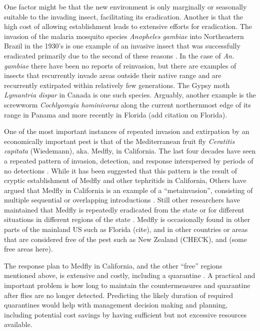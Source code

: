\documentclass[10pt,a4paper,twocolumn]{article}
\begin{document}
One factor might be that the new environment is only marginally or 
seasonally suitable to the invading insect, facilitating its eradication.
Another is that the high cost of allowing establishment leads
to extensive efforts for eradication.
The invasion of the malaria mosquito species \textit{Anopheles gambiae}
into Northeastern Brazil in the 1930's \cite{soper_emphanopheles_1943}
is one example of an invasive insect that was successfully eradicated 
primarily due to the second of these
reasons \cite{causey_ecology_1943,killeen_eradication_2002}.
In the case of \textit{An. gambiae} there have been no reports of
reinvasion, but there are examples of insects that
recurrently invade areas outside their native range and are recurrently
extirpated within relatively few generations.
The Gypsy moth \textit{Lymantria dispar} in Canada
\cite{gray_hitchhikers_2010} is one such species.
Arguably, another example is 
the screwworm \textit{Cochlyomyia hominivorax} along 
the current northernmost edge of its range in 
Panama\cite{robinson_enabling_2009}
and more recently in Florida (add citation on Florida).

One of the most important instances of repeated invasion 
and extirpation by an economically important pest is that of 
the Mediterranean fruit fly \textit{Ceratitis capitata} (Wiedemann), aka. Medfly, 
in California.  
The last four decades have seen a repeated pattern of
invasion, detection, and response 
interspersed by periods of no detections \cite{carey_establishment_1991, papadopoulos_trickle_2013}.
While it has been suggested that this pattern is the result of
cryptic establishment of Medfly and other tephritids in California, 
Others have argued that Medfly in California is an example of 
a ``metainvasion'', consisting of multiple sequential or
overlapping introductions \cite{davies_bioinvasions_1999}. 
Still other researchers have maintained 
that Medfly is repeatedly eradicated
from the state \cite{haymer_genetic_1997} or for different situations
in different regions of the state
\cite{bonizzoni_microsatellite_2001,gasperi_genetic_2002}.
Medfly is occasionally found in 
other parts of the mainland US such as Florida (cite),
and in other countries or areas that are considered 
free of the pest such as New Zealand (CHECK), and (some free areas here).

The response plan to Medfly in California, and the other ``free'' 
regions mentioned above, is extensive and costly, 
including a quarantine \cite{gilbert_insect_2013}.
A practical and important problem is how long to maintain 
the countermeasures and quarantine after flies are no longer detected.
Predicting the likely duration of required quarantines would help with
management decision making and planning,
including potential cost savings by having sufficient but not excessive
resources available.
\end{document}
